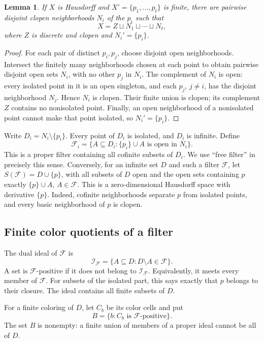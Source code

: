 \documentclass[11pt,letterpaper]{article}
\numberwithin{equation}{section}
\newtheorem{lemma}[lemma]{Lemma}
\theoremstyle{definition}
\theoremstyle{remark}
\theoremstyle{definition}
\newcommand{\F}{\mathcal F}
\newcommand{\I}{\mathcal I}
\newcommand{\sq}{\mathbin{\sqcup}}
\begin{document}
\begin{lemma}\label{fp:lem:decomposition}
If \(X\) is Hausdorff and \(X'=\{p_1,\ldots,p_t\}\) is finite, there are
pairwise disjoint clopen neighborhoods \(N_i\) of the \(p_i\) such that
\[
 X=Z\sq N_1\sq\cdots\sq N_t,
\]
where \(Z\) is discrete and clopen and \(N_i'=\{p_i\}\).
\end{lemma}
\begin{proof}
For each pair of distinct \(p_i,p_j\), choose disjoint open neighborhoods.
Intersect the finitely many neighborhoods chosen at each point to obtain
pairwise disjoint open sets \(N_i\), with no other \(p_j\) in \(N_i\).
The complement of \(N_i\) is open: every isolated point in it is an open
singleton, and each \(p_j\), \(j\ne i\), has the disjoint neighborhood
\(N_j\). Hence \(N_i\) is clopen. Their finite union is clopen; its
complement \(Z\) contains no nonisolated point. Finally, an open
neighborhood of a nonisolated point cannot make that point isolated, so
\(N_i'=\{p_i\}\).
\end{proof}

Write \(D_i=N_i\setminus\{p_i\}\). Every point of \(D_i\) is isolated,
and \(D_i\) is infinite. Define
\[
 \F_i=\{A\subseteq D_i:\{p_i\}\cup A\text{ is open in }N_i\}.
\]
This is a proper filter containing all cofinite subsets of \(D_i\). We
use ``free filter'' in precisely this sense. Conversely, for an infinite
set \(D\) and such a filter \(\F\), let \(S(\F)=D\cup\{p\}\), with
all subsets of \(D\) open and the open sets containing \(p\) exactly
\(\{p\}\cup A\), \(A\in\F\). This is a zero-dimensional Hausdorff
space with derivative \(\{p\}\). Indeed, cofinite neighborhoods separate
\(p\) from isolated points, and every basic neighborhood of \(p\) is
clopen.

\subsection{Finite color quotients of a filter}

The dual ideal of \(\F\) is
\[
 \I_{\F}=\{A\subseteq D:D\setminus A\in\F\}.
\]
A set is \(\F\)-positive if it does not belong to \(\I_{\F}\).
Equivalently, it meets every member of \(\F\). For subsets of the
isolated part, this says exactly that \(p\) belongs to their closure.
The ideal contains all finite subsets of \(D\).

For a finite coloring of \(D\), let \(C_b\) be its color cells and put
\begin{equation}\label{fp:eq:Bdef}
 B=\{b:C_b\text{ is }\F\text{-positive}\}.
\end{equation}
The set \(B\) is nonempty: a finite union of members of a proper ideal
cannot be all of \(D\).
\end{document}
